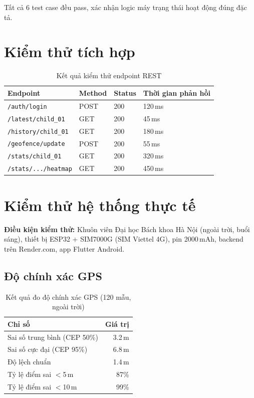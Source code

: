 \documentclass[13pt, a4paper]{report}
\begin{document}
Tất cả 6 test case đều pass, xác nhận logic máy trạng thái hoạt động đúng đặc tả.

\section{Kiểm thử tích hợp}

\begin{table}[H]
\centering
\caption{Kết quả kiểm thử endpoint REST}
\label{tab:api_test}
\begin{tabularx}{\textwidth}{l l l X}
\toprule
\textbf{Endpoint} & \textbf{Method} & \textbf{Status} & \textbf{Thời gian phản hồi} \\
\midrule
\texttt{/auth/login}        & POST & 200 & 120\,ms \\
\texttt{/latest/child\_01}  & GET  & 200 & 45\,ms \\
\texttt{/history/child\_01} & GET  & 200 & 180\,ms \\
\texttt{/geofence/update}   & POST & 200 & 55\,ms \\
\texttt{/stats/child\_01}   & GET  & 200 & 320\,ms \\
\texttt{/stats/.../heatmap} & GET  & 200 & 450\,ms \\
\bottomrule
\end{tabularx}
\end{table}

\section{Kiểm thử hệ thống thực tế}

\textbf{Điều kiện kiểm thử:} Khuôn viên Đại học Bách khoa Hà Nội (ngoài trời, buổi sáng), thiết bị ESP32 + SIM7000G (SIM Viettel 4G), pin 2000\,mAh, backend trên Render.com, app Flutter Android.

\subsection{Độ chính xác GPS}

\begin{table}[H]
\centering
\caption{Kết quả đo độ chính xác GPS (120 mẫu, ngoài trời)}
\label{tab:gps_accuracy}
\begin{tabular}{l r}
\toprule
\textbf{Chỉ số} & \textbf{Giá trị} \\
\midrule
Sai số trung bình (CEP 50\%) & 3.2\,m \\
Sai số cực đại (CEP 95\%)    & 6.8\,m \\
Độ lệch chuẩn                & 1.4\,m \\
Tỷ lệ điểm sai $<$5\,m       & 87\% \\
Tỷ lệ điểm sai $<$10\,m      & 99\% \\
\bottomrule
\end{tabular}
\end{table}
\end{document}
